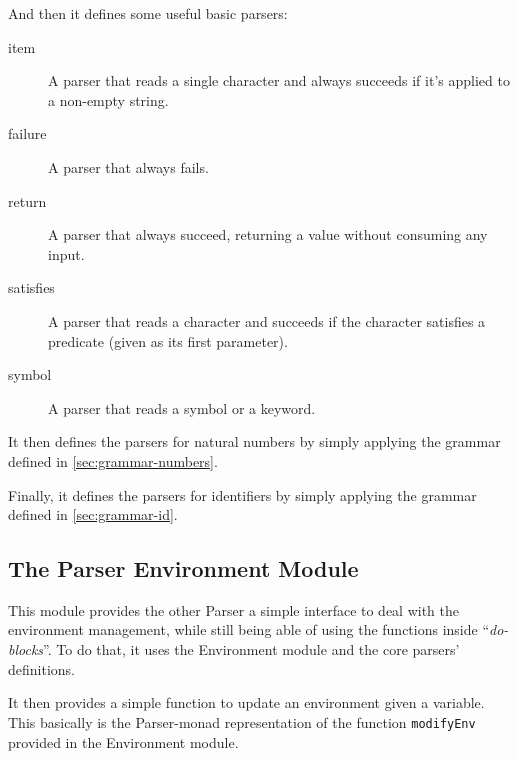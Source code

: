 \documentclass{esposito-documentation}
\begin{document}


And then it defines some useful basic parsers:
\begin{description}
	\item[item] A parser that reads a single character and always succeeds if
		it's applied to a non-empty string.
	\item[failure] A parser that always fails.
	\item[return] A parser that always succeed, returning a value without
		consuming any input.
	\item[satisfies] A parser that reads a character and succeeds if the
		character satisfies a predicate (given as its first parameter).
	\item[symbol] A parser that reads a symbol or a keyword.
\end{description}



It then defines the parsers for natural numbers by simply applying the grammar
defined in \autoref{sec:grammar-numbers}.



Finally, it defines the parsers for identifiers by simply applying the grammar
defined in \autoref{sec:grammar-id}.



\subsection{The Parser Environment Module}


This module provides the other Parser a simple interface to deal with the
environment management, while still being able of using the functions inside
``\emph{do-blocks}''. To do that, it uses the Environment module and the core
parsers' definitions.



It then provides a simple function to update an environment given a variable.
This basically is the Parser-monad representation of the function
\lstinline|modifyEnv| provided in the Environment module.


\end{document}
